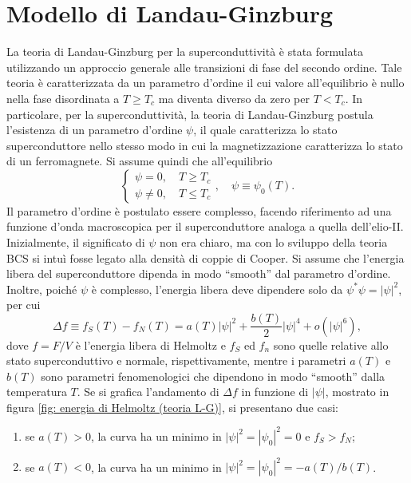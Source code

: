 \section{Modello di Landau-Ginzburg}
La teoria di Landau-Ginzburg per la superconduttività è stata formulata utilizzando un approccio generale alle transizioni di fase del secondo ordine. Tale teoria è caratterizzata da un parametro d'ordine il cui valore all'equilibrio è nullo nella fase disordinata a $T \ge T_c$ ma diventa diverso da zero per $T < T_c$. In particolare, per la superconduttività, la teoria di Landau-Ginzburg postula l'esistenza di un parametro d'ordine $\psi$, il quale caratterizza lo stato superconduttore nello stesso modo in cui la magnetizzazione caratterizza lo stato di un ferromagnete. Si assume quindi che all'equilibrio
\begin{equation} 
    \begin{cases}
        \psi = 0, \quad T \ge T_c \\
        \psi \neq 0, \quad T \le T_c
    \end{cases},\quad \psi \equiv \psi_0(T).
\end{equation}
Il parametro d'ordine è postulato essere complesso, facendo riferimento ad una funzione d'onda macroscopica per il superconduttore analoga a quella dell'elio-II. Inizialmente, il significato di $\psi$ non era chiaro, ma con lo sviluppo della teoria BCS si intuì fosse legato alla densità di coppie di Cooper. Si assume che l'energia libera del superconduttore dipenda in modo ``smooth'' dal parametro d'ordine. Inoltre, poiché $\psi$ è complesso, l'energia libera deve dipendere solo da $\psi^*\psi = |\psi|^2$, per cui
\begin{equation}
   \Delta f \equiv f_S(T) - f_N(T) = a(T)|\psi|^2 + \frac{b(T)}{2}|\psi|^4 + o(|\psi|^6),
\end{equation}
dove $f = F/V$ è l'energia libera di Helmoltz e $f_S$ ed $f_n$ sono quelle relative allo stato superconduttivo e normale, rispettivamente, mentre i parametri $a(T)$ e $b(T)$ sono parametri fenomenologici che dipendono in modo ``smooth'' dalla temperatura $T$. Se si grafica l'andamento di $\Delta f$ in funzione di $|\psi|$, mostrato in figura \ref{fig: energia di Helmoltz (teoria L-G)}, si presentano due casi:
\begin{enumerate}
    \item se $a(T) > 0$, la curva ha un minimo in $|\psi|^2 = |\psi_0|^2 = 0$ e $f_S > f_N$;
    \item se $a(T) < 0$, la curva ha un minimo in $|\psi|^2 = |\psi_0|^2 = -a(T)/b(T)$.
\end{enumerate}
